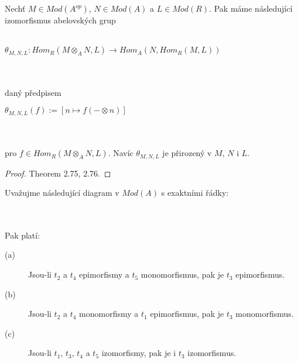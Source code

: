      \begin{thm}\label{thm-adjunkce}
       Nechť $M\in Mod(A^{op})$, $N\in Mod(A)$ a $L\in Mod(R)$. Pak máme 
       následující izomorfismus abelovských grup 
       \\\\
       \centerline{$\theta_{M,N,L}:Hom_R(M\otimes_A N, L)\rightarrow Hom_A(N,Hom_R(M,L))$} 
       \\\\
       daný předpisem \\
       \centerline{$\theta_{M,N,L}(f):=[n\mapsto f(-\otimes n)]$}
       \\\\
       pro $f\in Hom_R(M\otimes_A N,L)$. Navíc $\theta_{M,N,L}$ je přirozený v 
       $M$, $N$ i $L$.
     \end{thm}
     \begin{proof}
       \cite{5} Theorem 2.75, 2.76.
     \end{proof}     
     
     \begin{lem}\label{lemma-five} Uvažujme následující diagram 
       v $Mod(A)$ s exaktními řádky:\\
       \centerline{}\\\\
      Pak platí:
      \begin{description}
        \item[(a)] Jsou-li $t_2$ a $t_4$ epimorfismy a $t_5$ monomorfismus, pak 
        je $t_3$ epimorfismus.
        \item[(b)] Jsou-li $t_2$ a $t_4$ monomorfismy a $t_1$ epimorfismus, pak 
        je $t_3$ monomorfismus.
        \item[(c)] Jsou-li $t_1$, $t_3$, $t_4$ a $t_5$ izomorfismy, pak je i $t_3$ 
        izomorfismus.
      \end{description}
     \end{lem}
     
